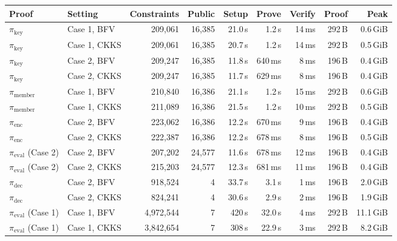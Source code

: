 \begin{tabular}{llrrrrrrr}
\toprule
Proof & Setting & Constraints & Public & Setup & Prove & Verify & Proof & Peak \\
\midrule
$\pi_{\text{key}}$ & Case 1, BFV & 209{,}061 & 16{,}385 & 21.0\,s & 1.2\,s & 14\,ms & 292\,B & 0.6\,GiB \\
$\pi_{\text{key}}$ & Case 1, CKKS & 209{,}061 & 16{,}385 & 20.7\,s & 1.2\,s & 14\,ms & 292\,B & 0.5\,GiB \\
$\pi_{\text{key}}$ & Case 2, BFV & 209{,}247 & 16{,}385 & 11.8\,s & 640\,ms & 8\,ms & 196\,B & 0.4\,GiB \\
$\pi_{\text{key}}$ & Case 2, CKKS & 209{,}247 & 16{,}385 & 11.7\,s & 629\,ms & 8\,ms & 196\,B & 0.4\,GiB \\
$\pi_{\text{member}}$ & Case 1, BFV & 210{,}840 & 16{,}386 & 21.1\,s & 1.2\,s & 15\,ms & 292\,B & 0.6\,GiB \\
$\pi_{\text{member}}$ & Case 1, CKKS & 211{,}089 & 16{,}386 & 21.5\,s & 1.2\,s & 10\,ms & 292\,B & 0.5\,GiB \\
$\pi_{\text{enc}}$ & Case 2, BFV & 223{,}062 & 16{,}386 & 12.2\,s & 670\,ms & 9\,ms & 196\,B & 0.4\,GiB \\
$\pi_{\text{enc}}$ & Case 2, CKKS & 222{,}387 & 16{,}386 & 12.2\,s & 678\,ms & 8\,ms & 196\,B & 0.5\,GiB \\
$\pi_{\text{eval}}$ (Case 2) & Case 2, BFV & 207{,}202 & 24{,}577 & 11.6\,s & 678\,ms & 12\,ms & 196\,B & 0.4\,GiB \\
$\pi_{\text{eval}}$ (Case 2) & Case 2, CKKS & 215{,}203 & 24{,}577 & 12.3\,s & 681\,ms & 11\,ms & 196\,B & 0.4\,GiB \\
$\pi_{\text{dec}}$ & Case 2, BFV & 918{,}524 & 4 & 33.7\,s & 3.1\,s & 1\,ms & 196\,B & 2.0\,GiB \\
$\pi_{\text{dec}}$ & Case 2, CKKS & 824{,}241 & 4 & 30.6\,s & 2.9\,s & 2\,ms & 196\,B & 1.9\,GiB \\
$\pi_{\text{eval}}$ (Case 1) & Case 1, BFV & 4{,}972{,}544 & 7 & 420\,s & 32.0\,s & 4\,ms & 292\,B & 11.1\,GiB \\
$\pi_{\text{eval}}$ (Case 1) & Case 1, CKKS & 3{,}842{,}654 & 7 & 308\,s & 22.9\,s & 3\,ms & 292\,B & 8.2\,GiB \\
\bottomrule
\end{tabular}
